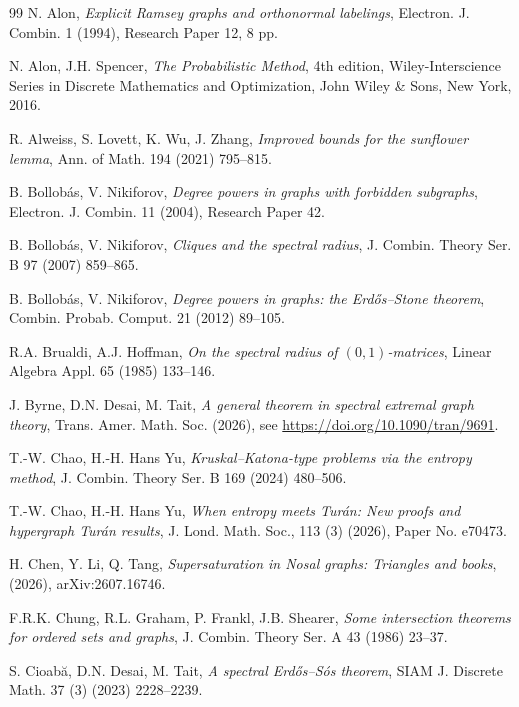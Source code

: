 \documentclass[11pt, a4paper]{article}
\theoremstyle{definition}
\theoremstyle{plain}
\begin{document}
\begin{thebibliography}{99}
N. Alon,
\emph{Explicit Ramsey graphs and orthonormal labelings},
{Electron. J. Combin.}  {1} (1994), Research Paper 12, 8 pp. 

N. Alon, J.H. Spencer, 
\emph{The Probabilistic Method}, 4th edition, Wiley-Interscience Series in Discrete Mathematics and Optimization, John Wiley \& Sons, New York, 2016. 

R. Alweiss, S. Lovett, K. Wu, J. Zhang,
\emph{Improved bounds for the sunflower lemma},
{Ann. of Math.}  {194} (2021) 795--815.

B. Bollob\'as, V. Nikiforov, \emph{Degree powers in graphs with forbidden subgraphs}, {Electron. J. Combin.}  {11} (2004), Research Paper 42.

B. Bollob\'as, V. Nikiforov, 
\emph{Cliques and the spectral radius}, 
{J. Combin. Theory Ser. B}  {97} (2007)  859--865.


B. Bollob\'as, V. Nikiforov,
\emph{Degree powers in graphs: the
Erd\H{o}s--Stone theorem},
{Combin. Probab. Comput.}  {21} (2012) 
89--105.

R.A. Brualdi, A.J. Hoffman,
\emph{On the spectral radius of $(0,1)$-matrices},
{Linear Algebra Appl.}  {65} (1985)  133--146.

J. Byrne, D.N. Desai, M. Tait, 
\emph{A general theorem in spectral extremal graph theory},  
Trans. Amer. Math. Soc. (2026), see \url{https://doi.org/10.1090/tran/9691}. 


T.-W. Chao, H.-H. Hans Yu, 
\emph{Kruskal--Katona-type problems via the entropy method}, 
J. Combin. Theory Ser.  B  {169} (2024) 480--506.  

T.-W. Chao, H.-H. Hans Yu, 
\emph{When entropy meets {Tur\'{a}n}: {New} proofs and hypergraph {Tur\'{a}n} results}, 
{J. Lond. Math. Soc.}, 113 (3) (2026), Paper No. e70473.

H. Chen, Y. Li, Q. Tang, 
\emph{Supersaturation in Nosal graphs: Triangles and books}, 
(2026), arXiv:2607.16746. 

F.R.K. Chung, R.L. Graham, P. Frankl, J.B. Shearer, \emph{Some intersection theorems for ordered sets and graphs},
{J. Combin. Theory Ser. A}  {43} (1986)  23--37.

  S. Cioab\u{a}, D.N. Desai, M. Tait,
 \emph{A spectral Erd\H{o}s--S\'{o}s theorem},
 SIAM J. Discrete Math. 37 (3) (2023) 2228--2239.


\end{thebibliography}
\end{document}
